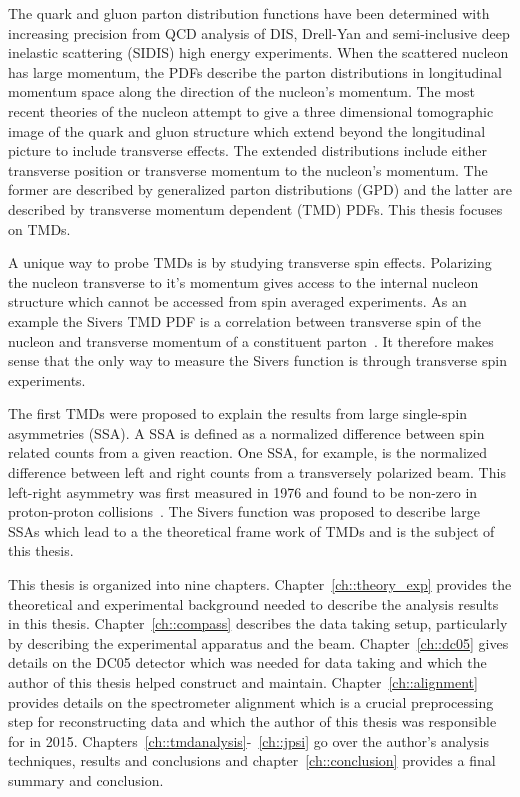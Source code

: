 The quark and gluon parton distribution functions have been determined with
increasing precision from QCD analysis of DIS, Drell-Yan and semi-inclusive deep
inelastic scattering (SIDIS) high energy experiments.  When the scattered
nucleon has large momentum, the PDFs describe the parton distributions
in longitudinal momentum space along the direction of the nucleon's momentum.
The most recent theories of the nucleon attempt to give a three dimensional
tomographic image of the quark and gluon structure which extend beyond the
longitudinal picture to include transverse effects.  The extended distributions
include either transverse position or transverse momentum to the nucleon's
momentum.  The former are described by generalized parton distributions (GPD)
and the latter are described by transverse momentum dependent (TMD) PDFs.  This
thesis focuses on TMDs.

A unique way to probe TMDs is by studying transverse spin effects.  Polarizing
the nucleon transverse to it's momentum gives access to the internal nucleon
structure which cannot be accessed from spin averaged experiments.  As an
example the Sivers TMD PDF is a correlation between transverse spin of the
nucleon and transverse momentum of a constituent parton~\cite{Sivers}.  It
therefore makes sense that the only way to measure the Sivers function is
through transverse spin experiments.

The first TMDs were proposed to explain the results from large single-spin
asymmetries (SSA).  A SSA is defined as a normalized difference between spin
related counts from a given reaction.  One SSA, for example, is the normalized
difference between left and right counts from a transversely polarized beam.
This left-right asymmetry was first measured in 1976 and found to be non-zero in
proton-proton collisions~\cite{PhysRevLett.36.929}.  The Sivers function was
proposed to describe large SSAs which lead to a the theoretical frame work of
TMDs and is the subject of this thesis.

This thesis is organized into nine chapters.  Chapter~\ref{ch::theory_exp}
provides the theoretical and experimental background needed to describe the
analysis results in this thesis.  Chapter~\ref{ch::compass} describes the data
taking setup, particularly by describing the experimental apparatus and the
beam.  Chapter~\ref{ch::dc05} gives details on the DC05 detector which was
needed for data taking and which the author of this thesis helped construct and
maintain.  Chapter~\ref{ch::alignment} provides details on the spectrometer
alignment which is a crucial preprocessing step for reconstructing data and
which the author of this thesis was responsible for in 2015.
Chapters~\ref{ch::tmdanalysis}-~\ref{ch::jpsi} go over the author's analysis
techniques, results and conclusions and chapter~\ref{ch::conclusion} provides
a final summary and conclusion.
